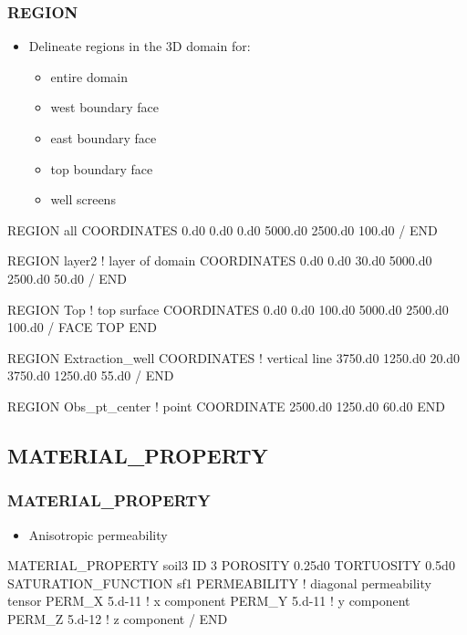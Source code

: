 \documentclass{beamer}
\newcommand\bluecomment[1]{{{\color{blue} #1}}}
\newcommand\magentacomment[1]{{{\color{magenta} #1}}}
\begin{document}
\begin{frame}\frametitle{REGION}

\begin{itemize}
  \item Delineate regions in the 3D domain for:
  \begin{itemize}
    \item entire domain
    \item west boundary face
    \item east boundary face
    \item top boundary face
    \item well screens
  \end{itemize}
\end{itemize}

\begin{semiverbatim}
REGION all
  COORDINATES
    0.d0 0.d0 0.d0
    5000.d0 2500.d0 100.d0
  /
END

\newpage
REGION layer2        \bluecomment{! layer of domain}
  COORDINATES
    0.d0 0.d0 30.d0
    5000.d0 2500.d0 50.d0
  /
END

REGION Top           \bluecomment{! top surface}
  COORDINATES
    0.d0 0.d0 100.d0
    5000.d0 2500.d0 100.d0
  /
  FACE TOP
END

\newpage
REGION Extraction_well
  COORDINATES             \bluecomment{! vertical line}
    3750.d0 1250.d0 20.d0
    3750.d0 1250.d0 55.d0
  /
END

REGION Obs_pt_center      \bluecomment{! point}
  \magentacomment{COORDINATE} 2500.d0 1250.d0 60.d0
END

\end{semiverbatim}

\end{frame}


\subsection{MATERIAL\_PROPERTY}

\begin{frame}\frametitle{MATERIAL\_PROPERTY}

\begin{itemize}
  \item Anisotropic permeability
\end{itemize}

\begin{semiverbatim}
MATERIAL_PROPERTY soil3
  ID 3
  POROSITY 0.25d0
  TORTUOSITY 0.5d0
  SATURATION_FUNCTION sf1
  PERMEABILITY        \bluecomment{! diagonal permeability tensor}
    PERM_X 5.d-11     \bluecomment{!   x component}
    PERM_Y 5.d-11     \bluecomment{!   y component}
    PERM_Z 5.d-12     \bluecomment{!   z component}
  /
END
\end{semiverbatim}

\end{frame}
\end{document}
